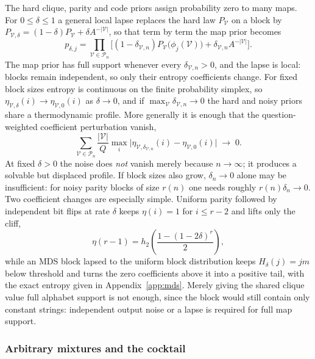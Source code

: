 The hard clique, parity and code priors assign probability zero to
many maps. For $0\le\delta\le1$ a general local lapse replaces the
hard law $P_{\mathcal V}$ on a block by
$P_{\mathcal V,\delta} = (1-\delta)P_{\mathcal V}
+ \delta A^{-|\mathcal V|}$, so that term by term the map prior
becomes
%
\begin{equation}
  p_{\delta,j}
  = \prod_{\mathcal V\in\mathcal P_n}
  \Big[(1-\delta_{\mathcal V,n})
    P_{\mathcal V}\big(\phi_j(\mathcal V)\big)
    + \delta_{\mathcal V,n}A^{-|\mathcal V|}\Big] . 
  \label{eq:lapse}
\end{equation}
%
The map prior has full support whenever every
$\delta_{\mathcal V,n} > 0$, and the lapse is local: blocks remain
independent, so only their entropy coefficients change. For fixed
block sizes entropy is continuous on the finite probability simplex,
so $\eta_{\mathcal V,\delta}(i)\to\eta_{\mathcal V,0}(i)$ as
$\delta\to0$, and if
$\max_{\mathcal V}\delta_{\mathcal V,n}\to0$ the hard and noisy
priors share a thermodynamic profile. More generally it is enough
that the question-weighted coefficient perturbation vanish,
%
\begin{equation}
  \sum_{\mathcal V\in\mathcal P_n}
  \frac{|\mathcal V|}{Q}
  \max_i\big|\eta_{\mathcal V,\delta_{\mathcal V,n}}(i)
  - \eta_{\mathcal V,0}(i)\big| \;\longrightarrow\; 0 .
  \label{eq:noisecondition}
\end{equation}
%
At fixed $\delta > 0$ the noise does \emph{not} vanish merely because
$n\to\infty$; it produces a solvable but displaced profile. If block
sizes also grow, $\delta_n\to0$ alone may be insufficient: for noisy
parity blocks of size $r(n)$ one needs roughly
$r(n)\delta_n\to0$. Two coefficient changes are especially simple.
Uniform parity followed by independent bit flips at rate $\delta$
keeps $\eta(i) = 1$ for $i\le r-2$ and lifts only the cliff,
%
\begin{equation}
  \eta(r-1)
  = h_2\!\left(\frac{1-(1-2\delta)^r}{2}\right),
  \label{eq:noisyparityeta}
\end{equation}
%
while an MDS block lapsed to the uniform block distribution keeps
$H_\delta(j) = jm$ below threshold and turns the zero coefficients
above it into a positive tail, with the exact entropy given in
Appendix~\ref{app:mds}. Merely giving the shared clique value full
alphabet support is not enough, since the block would still contain
only constant strings: independent output noise or a lapse is
required for full map support.

\subsubsection{Arbitrary mixtures and the cocktail}

